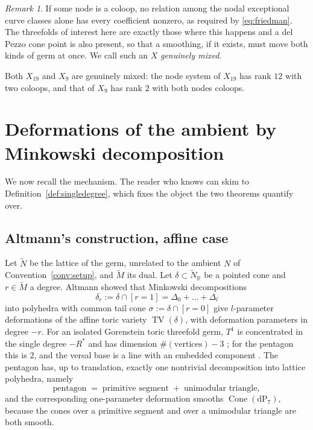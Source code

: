 \documentclass[11pt]{amsart}
\theoremstyle{definition}
\theoremstyle{remark}
\newtheorem{remark}[theorem]{Remark}
\theoremstyle{plain}
\newcommand{\RR}{\mathbb{R}}
\newcommand{\Cone}{\operatorname{Cone}}
\newcommand{\dP}{\mathrm{dP}}
\newcommand{\TV}{\operatorname{TV}}
\begin{document}
\begin{remark}\label{rem:coloop}
If some node is a coloop, no relation among the nodal exceptional curve
classes alone has every coefficient nonzero, as required by
\eqref{eq:friedman}.  The threefolds of interest here are exactly those where
this happens and a del Pezzo cone point is also present, so that a smoothing, if it exists,
must move both kinds of germ at once.  We call such an $X$ \emph{genuinely
mixed}.
\end{remark}

Both $X_{19}$ and $X_9$ are genuinely mixed:  the node system of $X_{19}$ has
rank $12$ with two coloops, and that of $X_9$ has rank $2$ with both nodes
coloops.

\section{Deformations of the ambient by Minkowski decomposition}\label{sec:mech}

We now recall the mechanism.  The reader who knows \cite{IV12} can skim to
Definition~\ref{def:singledegree}, which fixes the object the two theorems
quantify over.

\subsection{Altmann's construction, affine case}
Let $\widetilde N$ be the lattice of the germ, unrelated to the ambient $N$ of
Convention~\ref{conv:setup}, and $\widetilde M$ its dual.  Let
$\delta \subset \widetilde N_\RR$ be a pointed cone and $r \in \widetilde M$
a degree.  Altmann \cite{Altmann95,Altmann97} showed that Minkowski
decompositions
\[
  \delta_r := \delta \cap [r = 1] = \Delta_0 + \dots + \Delta_l
\]
into polyhedra with common tail cone $\sigma := \delta \cap [r=0]$ give
$l$-parameter deformations of the affine toric variety $\TV(\delta)$, with
deformation parameters in degree $-r$.  For an isolated Gorenstein toric
threefold germ, $T^1$ is concentrated in the single degree $-R^*$ and has
dimension $\#(\text{vertices}) - 3$ \cite[Thm.~6.5]{Altmann95}; for the
pentagon this is $2$, and the versal base is a line with an embedded component
\cite[(7.1.4)]{Altmann95}.  The pentagon has, up to translation, exactly one
nontrivial decomposition into lattice polyhedra, namely
\begin{equation}\label{eq:pentdecomp}
  \text{pentagon} \;=\; \text{primitive segment} \;+\; \text{unimodular triangle},
\end{equation}
and the corresponding one-parameter deformation smooths $\Cone(\dP_7)$, because
the cones over a primitive segment and over a unimodular triangle are both
smooth.
\end{document}
